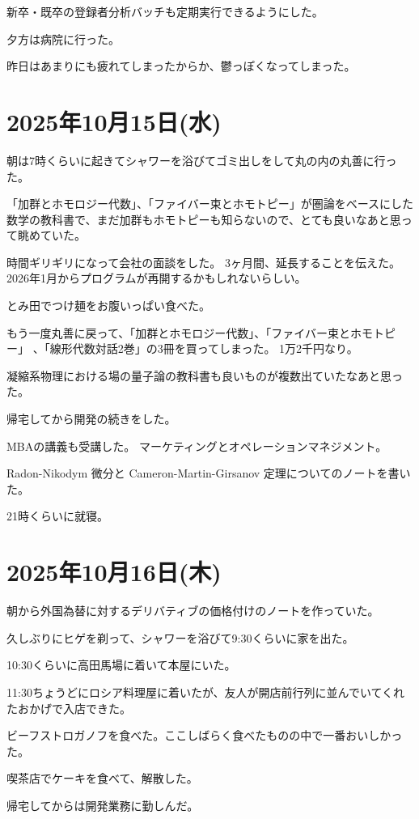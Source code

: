 \documentclass[uplatex]{jsarticle}
\begin{document}
新卒・既卒の登録者分析バッチも定期実行できるようにした。

夕方は病院に行った。

昨日はあまりにも疲れてしまったからか、鬱っぽくなってしまった。


\section{2025年10月15日(水)}

朝は7時くらいに起きてシャワーを浴びてゴミ出しをして丸の内の丸善に行った。

「加群とホモロジー代数」、「ファイバー束とホモトピー」が圏論をベースにした数学の教科書で、まだ加群もホモトピーも知らないので、とても良いなあと思って眺めていた。

時間ギリギリになって会社の面談をした。
3ヶ月間、延長することを伝えた。
2026年1月からプログラムが再開するかもしれないらしい。

とみ田でつけ麺をお腹いっぱい食べた。

もう一度丸善に戻って、「加群とホモロジー代数」、「ファイバー束とホモトピー」 、「線形代数対話2巻」の3冊を買ってしまった。
1万2千円なり。

凝縮系物理における場の量子論の教科書も良いものが複数出ていたなあと思った。

帰宅してから開発の続きをした。

MBAの講義も受講した。
マーケティングとオペレーションマネジメント。

Radon-Nikodym 微分と Cameron-Martin-Girsanov 定理についてのノートを書いた。

21時くらいに就寝。


\section{2025年10月16日(木)}

朝から外国為替に対するデリバティブの価格付けのノートを作っていた。

久しぶりにヒゲを剃って、シャワーを浴びて9:30くらいに家を出た。

10:30くらいに高田馬場に着いて本屋にいた。

11:30ちょうどにロシア料理屋に着いたが、友人が開店前行列に並んでいてくれたおかげで入店できた。

ビーフストロガノフを食べた。ここしばらく食べたものの中で一番おいしかった。

喫茶店でケーキを食べて、解散した。

帰宅してからは開発業務に勤しんだ。
\end{document}
